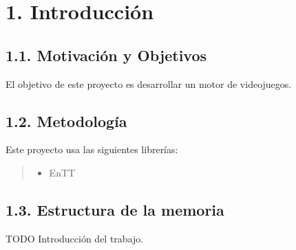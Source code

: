 \chapter*{1. Introducción}\label{cap:intro}

\section*{1.1. Motivación y Objetivos}\label{sec:motivation}

El objetivo de este proyecto es desarrollar un motor de videojuegos.

\section*{1.2. Metodología}\label{sec:methodology}

Este proyecto usa las siguientes librerías:
\begin{quote}
\begin{itemize}
    \item EnTT\cite{EnTT}
\end{itemize}
\end{quote}

\section*{1.3. Estructura de la memoria}\label{sec:structure}
TODO Introducción del trabajo.

